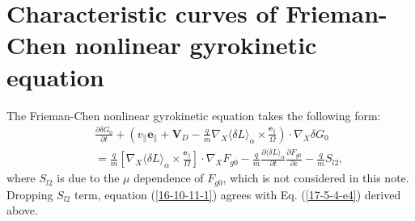 \documentclass{llncs}
\begin{document}
\section{Characteristic curves of Frieman-Chen nonlinear gyrokinetic equation}

The Frieman-Chen nonlinear gyrokinetic equation takes the following form:
\begin{eqnarray}
  &  & \frac{\partial \delta G_0}{\partial t} + \left( v_{\parallel}
  \mathbf{e}_{\parallel} +\mathbf{V}_D - \frac{q}{m} \nabla_X \langle \delta L
  \rangle_{\alpha} \times \frac{\mathbf{e}_{\parallel}}{\Omega} \right) \cdot
  \nabla_X \delta G_0 \nonumber\\
  &  & = \frac{q}{m} \left[ \nabla_X \langle \delta L \rangle_{\alpha} \times
  \frac{\mathbf{e}_{\parallel}}{\Omega} \right] \cdot \nabla_X F_{g 0} -
  \frac{q}{m} \frac{\partial \langle \delta L \rangle_{\alpha}}{\partial t}
  \frac{\partial F_{g 0}}{\partial \varepsilon} - \frac{q}{m} S_{l 2}, 
  \label{16-10-11-1}
\end{eqnarray}
where $S_{l 2}$ is due to the $\mu$ dependence of $F_{g 0}$, which is not
considered in this note. Dropping $S_{l 2}$ term, equation (\ref{16-10-11-1})
agrees with Eq. (\ref{17-5-4-e4}) derived above.
\end{document}
